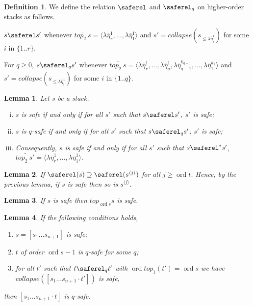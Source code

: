 \documentclass{article}
\newcommand{\ord}{\mathop{\mathrm{ord}}}
\newcommand{\prefixof}{\leqslant}
\newtheorem{lemma}{Lemma}[section]
\theoremstyle{remark}
\theoremstyle{definition}
\newtheorem{definition}{Definition}[section]
\newcommand\orddec\overline
\begin{document}
\begin{definition}
We define the relation $\saferel$ and $\saferel_q$ on higher-order
stacks as follows.

$s \saferel s'$ whenever $\orddec{top_2\ s} = \langle \lambda
\overline{\eta}_r^1, \ldots , \lambda \overline{\eta}_1^{1} \rangle$
and $s' = collapse (s_{\prefixof \lambda \overline{\eta}_i^1})$ for
some $i$ in $\{1..r\}$.

For $q\geq 0$, $s \saferel_q s'$ whenever $\orddec{top_2\ s} =
\langle \lambda \overline{\eta}_r^1, \ldots , \lambda
\overline{\eta}_q^1, \lambda \overline{\eta}_{q-1}^{k_{q-1}}, \ldots
, \lambda \overline{\eta}_1^{k_1} \rangle$ and $s' = collapse
(s_{\prefixof \lambda \overline{\eta}_i^1})$ for some $i$ in
$\{1..q\}$.

\end{definition}
\begin{lemma} Let $s$ be a stack.
\begin{enumerate}[i.]
  \item $s$ is safe if and only if for all $s'$ such that $s \saferel s'$, $s'$ is safe;

  \item $s$ is $q$-safe if and only if for all $s'$ such that $s \saferel_q s'$, $s'$ is safe;

  \item Consequently, $s$ is safe if and only if for all $s'$ such that $s
  \saferel^*
s'$, $\orddec{top_2\ s'} = \langle \lambda \overline{\eta}_r^1,
\ldots , \lambda \overline{\eta}_1^{1} \rangle$.
\end{enumerate}
\end{lemma}
\begin{lemma}
If $\saferel (s) \supseteq \saferel (s^{\langle j \rangle})$ for all
$j \geq \ord{t}$. Hence, by the previous lemma, if $s$ is safe then
so is $s^{\langle j \rangle}$.
\end{lemma}

\begin{lemma}
If $s$ is safe then $top_{\ord{s}} s$ is safe.
\end{lemma}
\begin{lemma}
If the following conditions holds,
\begin{enumerate}[1.]
\item $s = [s_1 \ldots s_{n+1}]$ is safe;
\item $t$ of order $\ord{s}-1$ is $q$-safe for some $q$;
\item for all $t'$ such that $t\saferel_q t'$ with
$\ord{top_1(t')} = \ord{s}$ we have $collapse([s_1 \ldots
s_{n+1} \cdot t'])$ is safe,
\end{enumerate}
then $[s_1 \ldots s_{n+1} \cdot t]$ is $q$-safe.
\end{lemma}
\end{document}

